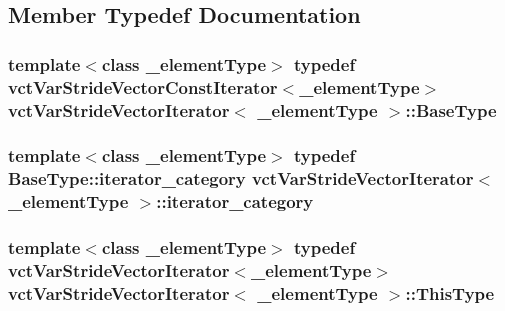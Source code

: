 \subsection{Member Typedef Documentation}
\hypertarget{classvct_var_stride_vector_iterator_a4d9d314c1190fa1e730dce082ac1010f}{
\subsubsection[{Base\-Type}]{\setlength{\rightskip}{0pt plus 5cm}template$<$class \-\_\-element\-Type$>$ typedef {\bf vct\-Var\-Stride\-Vector\-Const\-Iterator}$<$\-\_\-element\-Type$>$ {\bf vct\-Var\-Stride\-Vector\-Iterator}$<$ \-\_\-element\-Type $>$\-::{\bf Base\-Type}}}\label{classvct_var_stride_vector_iterator_a4d9d314c1190fa1e730dce082ac1010f}
\hypertarget{classvct_var_stride_vector_iterator_a17ad751139c29df7d21eb9c05e2f391b}{
\subsubsection[{iterator\-\_\-category}]{\setlength{\rightskip}{0pt plus 5cm}template$<$class \-\_\-element\-Type$>$ typedef Base\-Type\-::iterator\-\_\-category {\bf vct\-Var\-Stride\-Vector\-Iterator}$<$ \-\_\-element\-Type $>$\-::{\bf iterator\-\_\-category}}}\label{classvct_var_stride_vector_iterator_a17ad751139c29df7d21eb9c05e2f391b}
\hypertarget{classvct_var_stride_vector_iterator_a9c3effbe4fa874856b5b295a5fec25be}{
\subsubsection[{This\-Type}]{\setlength{\rightskip}{0pt plus 5cm}template$<$class \-\_\-element\-Type$>$ typedef {\bf vct\-Var\-Stride\-Vector\-Iterator}$<$\-\_\-element\-Type$>$ {\bf vct\-Var\-Stride\-Vector\-Iterator}$<$ \-\_\-element\-Type $>$\-::{\bf This\-Type}}}\label{classvct_var_stride_vector_iterator_a9c3effbe4fa874856b5b295a5fec25be}


